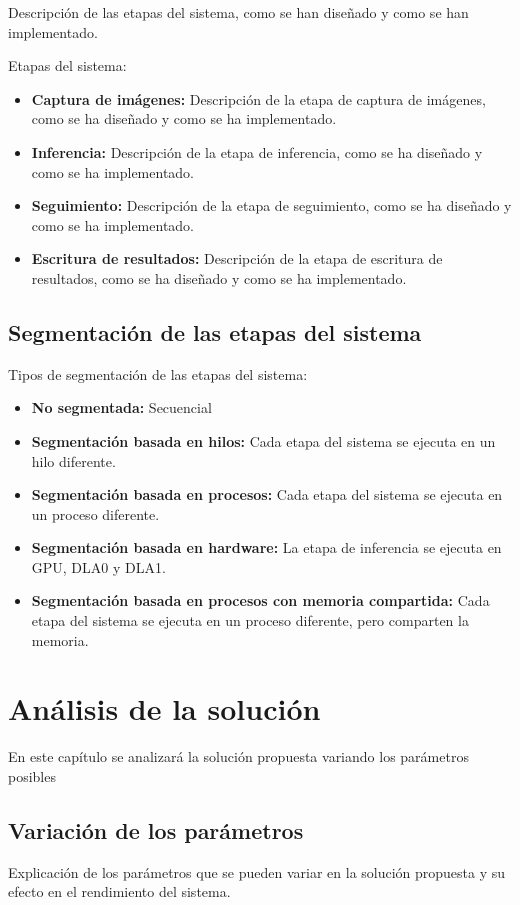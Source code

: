 \documentclass[11pt,spanish,listoffigures,listoftables]{tfgetsinf}
\begin{document}
Descripción de las etapas del sistema, como se han diseñado y como se han implementado.

Etapas del sistema:
\begin{itemize}
   \item \textbf{Captura de imágenes:} Descripción de la etapa de captura de imágenes, como se ha diseñado y como se ha implementado.
   \item \textbf{Inferencia:} Descripción de la etapa de inferencia, como se ha diseñado y como se ha implementado.
   \item \textbf{Seguimiento:} Descripción de la etapa de seguimiento, como se ha diseñado y como se ha implementado.
   \item \textbf{Escritura de resultados:} Descripción de la etapa de escritura de resultados, como se ha diseñado y como se ha implementado.
\end{itemize}

\section{Segmentación de las etapas del sistema}

Tipos de segmentación de las etapas del sistema:

\begin{itemize}
   \item \textbf{No segmentada:} Secuencial
   \item \textbf{Segmentación basada en hilos:} Cada etapa del sistema se ejecuta en un hilo diferente.
   \item \textbf{Segmentación basada en procesos:} Cada etapa del sistema se ejecuta en un proceso diferente.
   \item \textbf{Segmentación basada en hardware:} La etapa de inferencia se ejecuta en GPU, DLA0 y DLA1.
   \item \textbf{Segmentación basada en procesos con memoria compartida:} Cada etapa del sistema se ejecuta en un proceso diferente, pero comparten la memoria.
\end{itemize}
    


\chapter{Análisis de la solución}

En este capítulo se analizará la solución propuesta variando los parámetros posibles

\section{Variación de los parámetros}
Explicación de los parámetros que se pueden variar en la solución propuesta y su efecto en el rendimiento del sistema.
\end{document}
